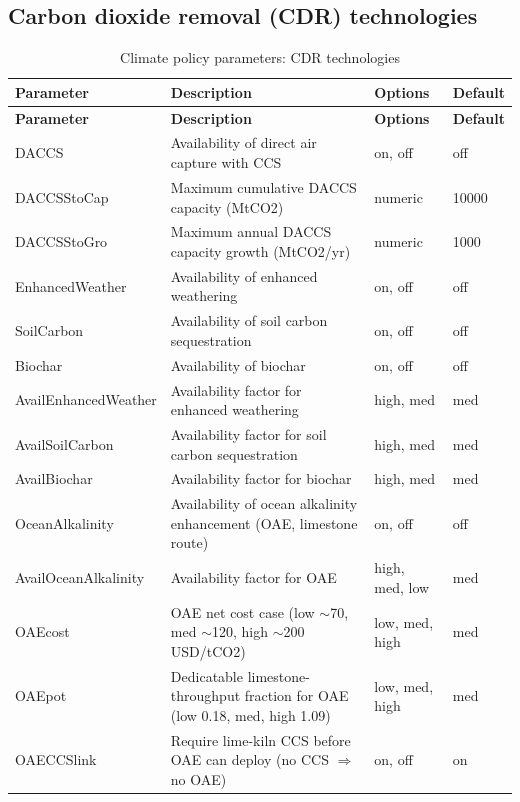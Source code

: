 \documentclass[10pt,a4paper,titlepage,dvipdfmx]{book}
\begin{document}
\subsection{Carbon dioxide removal (CDR) technologies}
\begin{longtable}{|p{}|p{}|p{}|p{}|}
\caption{Climate policy parameters: CDR technologies}\label{tab:sp-clp-cdr}\\
\hline
\textbf{Parameter} & \textbf{Description} & \textbf{Options} & \textbf{Default} \\ \hline
\endfirsthead
\hline
\textbf{Parameter} & \textbf{Description} & \textbf{Options} & \textbf{Default} \\ \hline
\endhead
\hline
\endfoot
DACCS & Availability of direct air capture with CCS & on, off & off \\ \hline
DACCSStoCap & Maximum cumulative DACCS capacity (MtCO2) & numeric & 10000 \\ \hline
DACCSStoGro & Maximum annual DACCS capacity growth (MtCO2/yr) & numeric & 1000 \\ \hline
EnhancedWeather & Availability of enhanced weathering & on, off & off \\ \hline
SoilCarbon & Availability of soil carbon sequestration & on, off & off \\ \hline
Biochar & Availability of biochar & on, off & off \\ \hline
AvailEnhancedWeather & Availability factor for enhanced weathering & high, med & med \\ \hline
AvailSoilCarbon & Availability factor for soil carbon sequestration & high, med & med \\ \hline
AvailBiochar & Availability factor for biochar & high, med & med \\ \hline
OceanAlkalinity & Availability of ocean alkalinity enhancement (OAE, limestone route) & on, off & off \\ \hline
AvailOceanAlkalinity & Availability factor for OAE & high, med, low & med \\ \hline
OAEcost & OAE net cost case (low $\sim$70, med $\sim$120, high $\sim$200 USD/tCO2) & low, med, high & med \\ \hline
OAEpot & Dedicatable limestone-throughput fraction for OAE (low 0.18, med, high 1.09) & low, med, high & med \\ \hline
OAECCSlink & Require lime-kiln CCS before OAE can deploy (no CCS $\Rightarrow$ no OAE) & on, off & on \\ \hline

\end{longtable}
\end{document}
